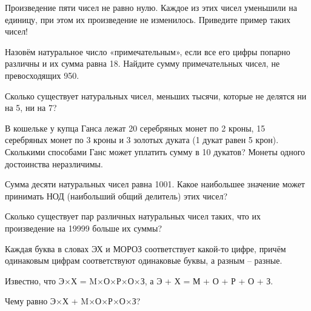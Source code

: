 \newpage
\hspace{6mm}

 Произведение пяти чисел не равно нулю. Каждое из этих чисел уменьшили на единицу, при этом их произведение не изменилось. Приведите пример таких чисел!


 Назовём натуральное число «примечательным»,
если все его цифры попарно различны и их сумма равна 18. Найдите сумму примечательных
чисел, не превосходящих 950.

 Сколько существует натуральных чисел, меньших тысячи, которые не делятся
ни на 5, ни на 7?




 В кошельке у купца Ганса лежат 20 серебряных
монет по 2 кроны, 15 серебряных монет по 3 кроны и 3 золотых дуката (1 дукат равен 5 крон).
Сколькими способами Ганс может уплатить сумму в 10 дукатов? Монеты одного достоинства
неразличимы.


 Сумма десяти натуральных чисел равна 1001. Какое наибольшее
значение может принимать НОД (наибольший общий делитель) этих чисел?



 Сколько существует пар различных натуральных чисел таких, что их
произведение на 19999 больше их суммы?



 Каждая буква в словах ЭХ и МОРОЗ соответствует какой-то цифре, причём одинаковым цифрам соответствуют одинаковые буквы, а разным – разные.

Известно, что  Э$\times$Х = M$\times$О$\times$Р$\times$О$\times$З,  а  Э + Х = М + О + Р + О + З. 

Чему равно  Э$\times$Х + M$\times$О$\times$Р$\times$О$\times$З?

